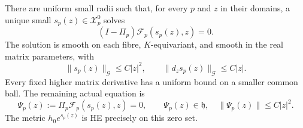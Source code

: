 \begin{proposition}\label{prop:projected-he}
There are uniform small radii such that, for every $p$
and $z$ in their domains, a unique small
$s_p(z)\in\mathcal X_p^0$ solves
\begin{equation}\label{eq:projected-equation}
             (I-\Pi_p)\mathcal F_p(s_p(z),z)=0.
\end{equation}
The solution is smooth on each fibre, $K$-equivariant,
and smooth in the real matrix parameters, with
\begin{equation}\label{eq:he-complement-size}
 \|s_p(z)\|_{\mathcal G}\le C|z|^2,
 \qquad\|d_zs_p(z)\|_{\mathcal G}\le C|z|.
\end{equation}
Every fixed higher matrix derivative has a uniform bound
on a smaller common ball. The remaining actual equation is
\begin{equation}\label{eq:finite-actual-moment}
 \Psi_p(z):=\Pi_p\mathcal F_p(s_p(z),z)=0,
           \qquad\Psi_p(z)\in\mathfrak h,
           \quad\|\Psi_p(z)\|\le C|z|^2.
\end{equation}
The metric $h_0e^{s_p(z)}$ is HE precisely on this zero set.
\end{proposition}

